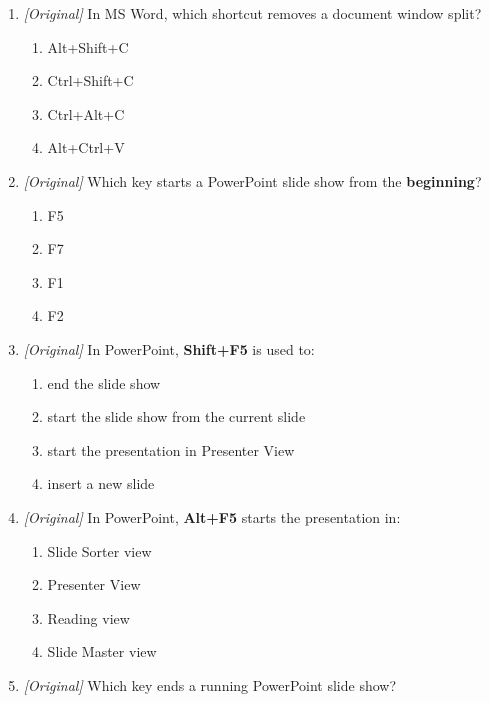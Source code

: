 \documentclass[11pt]{article}
\begin{document}
\begin{enumerate}[label=\textbf{Q\arabic*.}, leftmargin=*]
  an address database to produce many personalised letters is called:
  \begin{enumerate}[label=\Alph*.]
    \item Track Changes
    \item AutoCorrect
    \item Mail Merge
    \item Find and Replace
  \end{enumerate}
\item \textit{[Original]} In MS Word, which shortcut removes a document window
  split?
  \begin{enumerate}[label=\Alph*.]
    \item Alt+Shift+C
    \item Ctrl+Shift+C
    \item Ctrl+Alt+C
    \item Alt+Ctrl+V
  \end{enumerate}
\item \textit{[Original]} Which key starts a PowerPoint slide show from the
  \textbf{beginning}?
  \begin{enumerate}[label=\Alph*.]
    \item F5
    \item F7
    \item F1
    \item F2
  \end{enumerate}
\item \textit{[Original]} In PowerPoint, \textbf{Shift+F5} is used to:
  \begin{enumerate}[label=\Alph*.]
    \item end the slide show
    \item start the slide show from the current slide
    \item start the presentation in Presenter View
    \item insert a new slide
  \end{enumerate}
\item \textit{[Original]} In PowerPoint, \textbf{Alt+F5} starts the
  presentation in:
  \begin{enumerate}[label=\Alph*.]
    \item Slide Sorter view
    \item Presenter View
    \item Reading view
    \item Slide Master view
  \end{enumerate}
\item \textit{[Original]} Which key ends a running PowerPoint slide show?

\end{enumerate}
\end{document}
